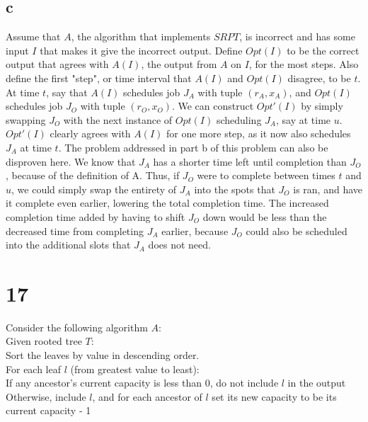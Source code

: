 \documentclass[letterpaper,notitlepage,twoside]{article}
\newcommand\tab[1][1cm]{\hspace*{#1}} %
\begin{document}
\subsection*{c}
Assume that $A$, the algorithm that implements $SRPT$, is incorrect and has some input $I$ that makes it give the incorrect output. Define $Opt(I)$ to be the correct output that agrees with $A(I)$, the output from $A$ on $I$, for the most steps. Also define the first "step", or time interval that $A(I)$ and $Opt(I)$ disagree, to be $t$. At time $t$, say that $A(I)$ schedules job $J_A$ with tuple $(r_A, x_A)$, and $Opt(I)$ schedules job $J_O$ with tuple $(r_O, x_O)$. We can construct $Opt'(I)$ by simply swapping $J_O$ with the next instance of $Opt(I)$ scheduling $J_A$, say at time $u$. \\
$Opt'(I)$ clearly agrees with $A(I)$ for one more step, as it now also schedules $J_A$ at time $t$. The problem addressed in part b of this problem can also be disproven here. We know that $J_A$ has a shorter time left until completion than $J_O$, because of the definition of A. Thus, if $J_O$ were to complete between times $t$ and $u$, we could simply swap the entirety of $J_A$ into the spots that $J_O$ is ran, and have it complete even earlier, lowering the total completion time. The increased completion time added by having to shift $J_O$ down would be less than the decreased time from completing $J_A$ earlier, because $J_O$ could also be scheduled into the additional slots that $J_A$ does not need.  

\section*{17}
Consider the following algorithm $A$:\\
Given rooted tree $T$:\\
\tab Sort the leaves by value in descending order.\\
\tab For each leaf $l$ (from greatest value to least): \\ 
\tab\tab If any ancestor's current capacity is less than 0, do not include $l$ in the output
\tab\tab Otherwise, include $l$, and for each ancestor of $l$ set its new capacity to be its current capacity - 1
\end{document}
